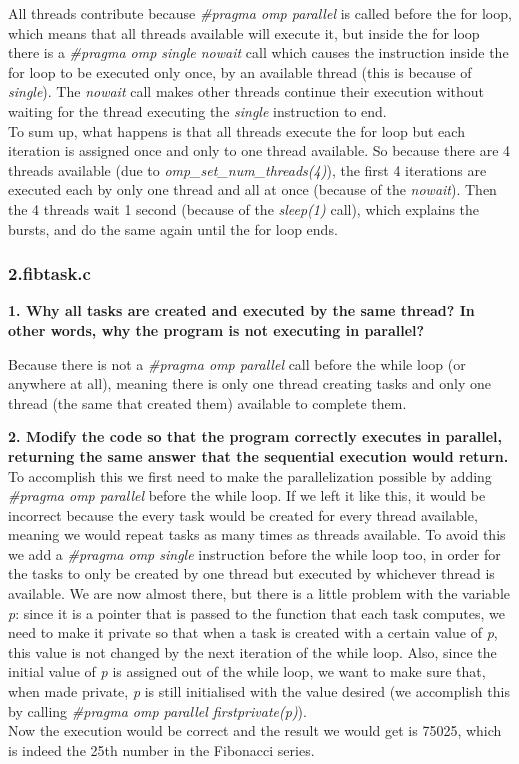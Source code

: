 \documentclass[12]{article}
\begin{document}
All threads contribute because \textit{\#pragma omp parallel} is called before the for loop, which means that all threads available will execute it, but inside the for loop there is a \textit{\#pragma omp single nowait} call which causes the instruction inside the for loop to be executed only once, by an available thread (this is because of \textit{single}). The \textit{nowait} call makes other threads continue their execution without waiting for the thread executing the \textit{single} instruction to end. \\
To sum up, what happens is that all threads execute the for loop but each iteration is assigned once and only to one thread available. So because there are 4 threads available (due to \textit{omp\_set\_num\_threads(4)}), the first 4 iterations are executed each by only one thread and all at once (because of the \textit{nowait}). Then the 4 threads wait 1 second (because of the \textit{sleep(1)} call), which explains the bursts, and do the same again until the for loop ends.

\subsubsection{2.fibtask.c}
\textbf{1. Why all tasks are created and executed by the same thread? In other words, why the program
is not executing in parallel?} 

Because there is not a \textit{\#pragma omp parallel} call before the while loop (or anywhere at all), meaning there is only one thread creating tasks and only one thread (the same that created them) available to complete them. 

\textbf{2. Modify the code so that the program correctly executes in parallel, returning the same answer that the sequential execution would return.}
To accomplish this we first need to make the parallelization possible by adding \textit{\#pragma omp parallel} before the while loop. If we left it like this, it would be incorrect because the every task would be created for every thread available, meaning we would repeat tasks as many times as threads available. To avoid this we add a \textit{\#pragma omp single} instruction before the while loop too, in order for the tasks to only be created by one thread but executed by whichever thread is available. We are now almost there, but there is a little problem with the variable \textit{p}: since it is a pointer that is passed to the function that each task computes, we need to make it private so that when a task is created with a certain value of \textit{p}, this value is not changed by the next iteration of the while loop. Also, since the initial value of \textit{p} is assigned out of the while loop, we want to make sure that, when made private, \textit{p} is still initialised with the value desired (we accomplish this by calling \textit{\#pragma omp parallel firstprivate(p)}). \\
Now the execution would be correct and the result we would get is 75025, which is indeed the 25th number in the Fibonacci series.\\
\medskip
\end{document}
